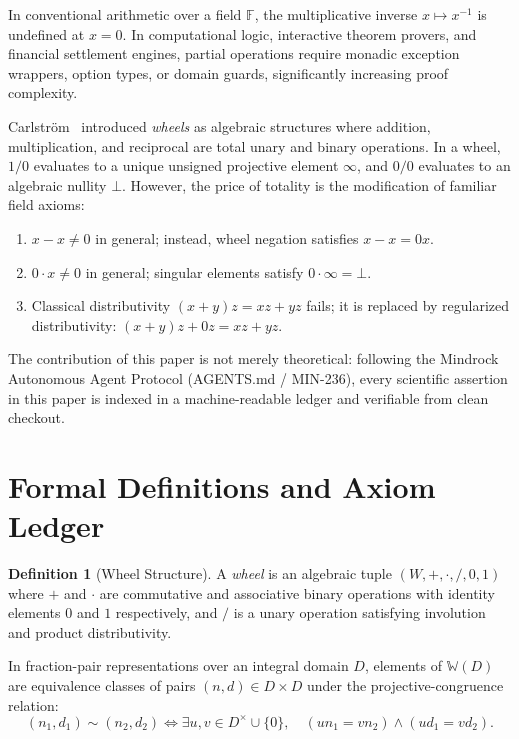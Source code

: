 \documentclass[11pt,a4paper]{article}
\theoremstyle{plain}
\theoremstyle{definition}
\newtheorem{definition}[theorem]{Definition}
\theoremstyle{remark}
\newcommand{\W}{\mathbb{W}}
\newcommand{\bott}{\bot}
\newcommand{\inft}{\infty}
\begin{document}
In conventional arithmetic over a field $\mathbb{F}$, the multiplicative inverse $x \mapsto x^{-1}$ is undefined at $x = 0$. In computational logic, interactive theorem provers, and financial settlement engines, partial operations require monadic exception wrappers, option types, or domain guards, significantly increasing proof complexity.

Carlström~\cite{carlstrom2004} introduced \textit{wheels} as algebraic structures where addition, multiplication, and reciprocal are total unary and binary operations. In a wheel, $1/0$ evaluates to a unique unsigned projective element $\inft$, and $0/0$ evaluates to an algebraic nullity $\bott$. However, the price of totality is the modification of familiar field axioms:
\begin{enumerate}
    \item $x - x \neq 0$ in general; instead, wheel negation satisfies $x - x = 0x$.
    \item $0 \cdot x \neq 0$ in general; singular elements satisfy $0 \cdot \inft = \bott$.
    \item Classical distributivity $(x+y)z = xz + yz$ fails; it is replaced by regularized distributivity: $(x+y)z + 0z = xz + yz$.
\end{enumerate}

The contribution of this paper is not merely theoretical: following the Mindrock Autonomous Agent Protocol (AGENTS.md / MIN-236), every scientific assertion in this paper is indexed in a machine-readable ledger and verifiable from clean checkout.

\section{Formal Definitions and Axiom Ledger}
\label{sec:axiom-ledger}

\begin{definition}[Wheel Structure]
\label{def:wheel}
A \textit{wheel} is an algebraic tuple $(W, +, \cdot, /, 0, 1)$ where $+$ and $\cdot$ are commutative and associative binary operations with identity elements $0$ and $1$ respectively, and $/$ is a unary operation satisfying involution and product distributivity.
\end{definition}

In fraction-pair representations over an integral domain $D$, elements of $\W(D)$ are equivalence classes of pairs $(n, d) \in D \times D$ under the projective-congruence relation:
\begin{equation}
(n_1, d_1) \sim (n_2, d_2) \iff \exists u, v \in D^\times \cup \{0\}, \quad (u n_1 = v n_2) \land (u d_1 = v d_2).
\end{equation}
\end{document}
